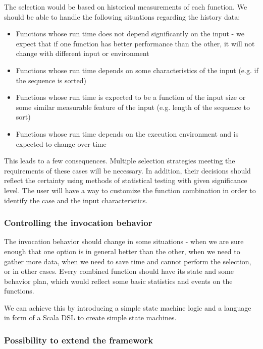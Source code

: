 The selection would be based on historical measurements of each function. We should be able to handle the following situations regarding the history data:

\begin{itemize}
	\item Functions whose run time does not depend significantly on the input - we expect that if one function has better performance than the other, it will not change with different input or environment
	\item Functions whose run time depends on some characteristics of the input (e.g. if the sequence is sorted)
	\item Functions whose run time is expected to be a function of the input size or some similar measurable feature of the input (e.g. length of the sequence to sort)
	\item Functions whose run time depends on the execution environment and is expected to change over time
\end{itemize}

This leads to a few consequences. Multiple selection strategies meeting the requirements of these cases will be necessary. In addition, their decisions should reflect the certainty using methods of statistical testing with given significance level. The user will have a way to customize the function combination in order to identify the case and the input characteristics.

\subsubsection{Controlling the invocation behavior}

The invocation behavior should change in some situations - when we are sure enough that one option is in general better than the other, when we need to gather more data, when we need to save time and cannot perform the selection, or in other cases. Every combined function should have its state and some behavior plan, which would reflect some basic statistics and events on the functions.

We can achieve this by introducing a simple state machine logic and a language in form of a Scala DSL to create simple state machines.

\subsubsection{Possibility to extend the framework}

